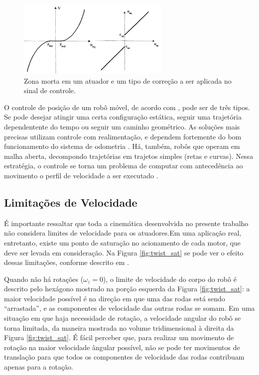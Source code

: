 \begin{figure}[h]
  \centering
  \includegraphics[width = 0.65\textwidth]{imagens/zonamorta0}
  \caption{Zona morta em um atuador e um tipo de correção a ser aplicada no sinal de controle.}
  \label{fig:cont_zm}
\end{figure}

O controle de posição de um robô móvel, de acordo com \citet{siegwart2011introduction}, pode ser de três tipos. Se pode desejar atingir uma certa configuração estática, seguir uma trajetória dependentente do tempo ou seguir um caminho geométrico. As soluções mais precisas utilizam controle com realimentação, e dependem fortemente do bom funcionamento do sistema de odometria \citep{samani2007comprehensive}. Há, também, robôs que operam em malha aberta, decompondo trajetórias em trajetos simples (retas e curvas). Nessa estratégia, o controle se torna um problema de computar com antecedência ao movimento o perfil de velocidade a ser executado \citep{siegwart2011introduction}.

\subsection{Limitações de Velocidade}

É importante ressaltar que toda a cinemática desenvolvida no presente trabalho não considera limites de velocidade para os atuadores.Em uma aplicação real, entretanto, existe um ponto de saturação no acionamento de cada motor, que deve ser levada em consideração. Na Figura \ref{fig:twist_sat} se pode ver o efeito dessas limitações, conforme descrito em \citet{lynch2017modern}.

Quando não há rotações ($\omega_z = 0$), o limite de velocidade do corpo do robô é descrito pelo hexágono mostrado na porção esquerda da Figura \ref{fig:twist_sat}: a maior velocidade possível é na direção em que uma das rodas está sendo ``arrastada'', e as componentes de velocidade das outras rodas se somam. Em uma situação em que haja necessidade de rotação, a velocidade angular do robô se torna limitada, da maneira mostrada no volume tridimensional à direita da Figura \ref{fig:twist_sat}. É fácil perceber que, para realizar um movimento de rotação na maior velocidade ângular possível, não se pode ter movimentos de translação para que todos os componentes de velocidade das rodas contribuam apenas para a rotação.

